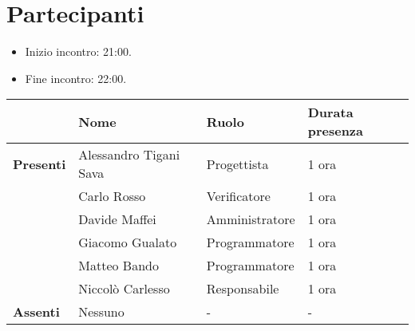 \section*{Partecipanti}

\begin{itemize}
	\item Inizio incontro: 21:00.
	\item Fine incontro: 22:00.
\end{itemize}


\begin{center}
	\begin{tabular}{llll}
		                  & \textbf{Nome}          & \textbf{Ruolo} & \textbf{Durata presenza}	\\
		\hline
		\textbf{Presenti} & Alessandro Tigani Sava & Progettista		& 1 ora					\\
		                  & Carlo Rosso            & Verificatore		& 1 ora 	            \\
		                  & Davide Maffei          & Amministratore		& 1 ora 	            \\
		                  & Giacomo Gualato        & Programmatore		& 1 ora 	            \\
		                  & Matteo Bando           & Programmatore		& 1 ora 	            \\
		                  & Niccolò Carlesso       & Responsabile    	& 1 ora 	            \\
		\hline
		\textbf{Assenti}  & Nessuno                & -              & -							\\
	\end{tabular}
\end{center}
